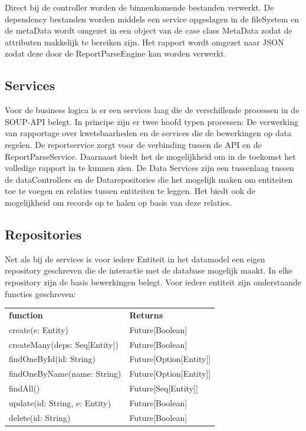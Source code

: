 Direct bij de controller worden de binnenkomende bestanden verwerkt. De dependency bestanden worden middels een service opgeslagen in de fileSystem en de metaData wordt omgezet in een object van de case class MetaData zodat de attributen makkelijk te bereiken zijn. Het rapport wordt omgezet naar JSON zodat deze door de ReportParseEngine kan worden verwerkt.

\subsection{Services}\label{subsec:Services}
Voor de business logica is er een services laag die de verschillende processen in de SOUP-API belegt. In principe zijn er twee hoofd typen processen: De verwerking van rapportage over kwetsbaarheden en de services die de bewerkingen op data regelen.
De reportservice zorgt voor de verbinding tussen de API en de ReportParseService. Daarnaast biedt het de mogelijkheid om in de toekomst het volledige rapport in te kunnen zien.
De Data Services zijn een tussenlaag tussen de dataControllers en de Datarepositories die het mogelijk maken om entiteiten toe te voegen en relaties tussen entiteiten te leggen. Het biedt ook de mogelijkheid om records op te halen op basis van deze relaties.

\subsection{Repositories}\label{subsec:repositories}
Net als bij de services is voor iedere Entiteit in het datamodel een eigen repository geschreven die de interactie met de database mogelijk maakt. In elke repository zijn de basis bewerkingen belegt. Voor iedere entiteit zijn onderstaande functies geschreven:

\begin{tabular}{ll}
    \textbf{function} & \textbf{Returns}\\
    create(e: Entity) & Future[Boolean] \\
    createMany(deps: Seq[Entity])& Future[Boolean]\\
    findOneById(id: String) & Future[Option[Entity]]\\
    findOneByName(name: String) & Future[Option[Entity]]\\
    findAll() & Future[Seq[Entity]] \\
    update(id: String, e: Entity) & Future[Boolean]\\
    delete(id: String) & Future[Boolean] \\
\end{tabular} \\

